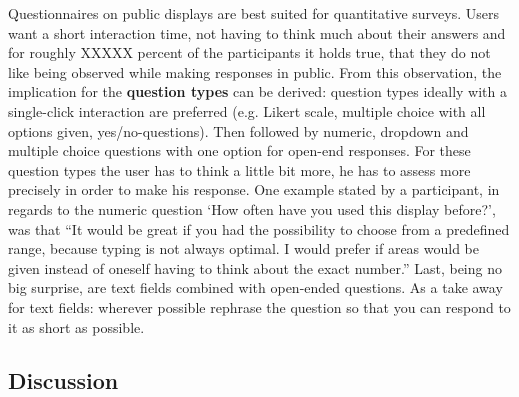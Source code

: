 	
	Questionnaires on public displays are best suited for quantitative surveys. Users want a short interaction time, not having to think much about their answers and for roughly XXXXX percent of the participants it holds true, that they do not like being observed while making responses in public.
	From this observation, the implication for the \textbf{question types} can be derived: question types ideally with a single-click interaction are preferred (e.g. Likert scale, multiple choice with all options given, yes/no-questions). Then followed by numeric, dropdown and multiple choice questions with one option for open-end responses. For these question types the user has to think a little bit more, he has to assess more precisely in order to make his response. One example stated by a participant, in regards to the numeric question `How often have you used this display before?', was that ``It would be great if you had the possibility to choose from a predefined range, because typing is not always optimal. I would prefer if areas would be given instead of oneself having to think about the exact number.'' Last, being no big surprise, are text fields combined with open-ended questions. As a take away for text fields: wherever possible rephrase the question so that you can respond to it as short as possible.




\clearpage
\subsection{Discussion}







